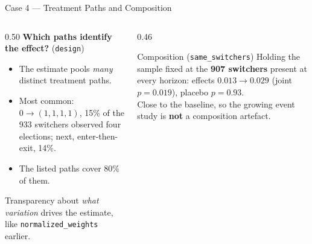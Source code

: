 \documentclass[main.tex]{subfiles}
\begin{document}
\begin{frame}[fragile]{Case 4 --- Treatment Paths and Composition}

  \begin{columns}[T]
    \begin{column}{0.50\textwidth}
      \textbf{Which paths identify the effect?} (\texttt{design})
      \begin{itemize}\footnotesize
        \item The estimate pools \emph{many} distinct treatment paths.
        \item Most common: $0\to(1,1,1,1)$, 15\% of the 933 switchers
          observed four elections; next, enter-then-exit, 14\%.
        \item The listed paths cover 80\% of them.
      \end{itemize}

      \smallskip
      \footnotesize Transparency about \emph{what variation} drives the
      estimate, like \texttt{normalized\_weights} earlier.
    \end{column}
    \begin{column}{0.46\textwidth}
      \begin{block}{Composition (\texttt{same\_switchers})}
        \footnotesize
        Holding the sample fixed at the \textbf{907 switchers} present at
        every horizon: effects $0.013\to0.029$ (joint $p=0.019$), placebo
        $p=0.93$.\\[4pt]
        Close to the baseline, so the growing event study is \textbf{not}
        a composition artefact.
      \end{block}
    \end{column}
  \end{columns}

\end{frame}
\end{document}
